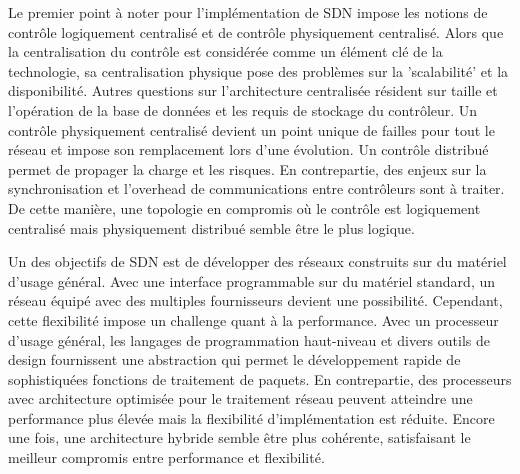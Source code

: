 Le premier point à noter pour l'implémentation de SDN impose les notions de contrôle logiquement centralisé et de contrôle physiquement centralisé. Alors que la centralisation du contrôle est considérée comme un élément clé de la technologie, sa centralisation physique pose des problèmes sur la 'scalabilité' et la disponibilité. Autres questions sur l'architecture centralisée résident sur taille et l'opération de la base de données et les requis de stockage du contrôleur. Un contrôle physiquement centralisé devient un point unique de failles pour tout le réseau et impose son remplacement lors d'une évolution. Un contrôle distribué permet de propager la charge et les risques. En contrepartie, des enjeux sur la synchronisation et l'overhead de communications entre contrôleurs sont à traiter. De cette manière, une topologie en compromis où le contrôle est logiquement centralisé mais physiquement distribué semble être le plus logique. \cite{sdnbookControlDataPlanes} \cite{SurveySDNArchi}



Un des objectifs de SDN est de développer des réseaux construits sur du matériel d'usage général. Avec une interface programmable sur du matériel standard, un réseau équipé avec des multiples fournisseurs devient une possibilité. Cependant, cette flexibilité impose un challenge quant à la performance. Avec un processeur d'usage général, les langages de programmation haut-niveau et divers outils de design fournissent une abstraction qui permet le développement rapide de sophistiquées fonctions de traitement de paquets. En contrepartie, des processeurs avec architecture optimisée pour le traitement réseau peuvent atteindre une performance plus élevée mais la flexibilité d'implémentation est réduite. Encore une fois, une architecture hybride semble être plus cohérente, satisfaisant le meilleur compromis entre performance et flexibilité. \cite{ImplementationKeyChallenges}



